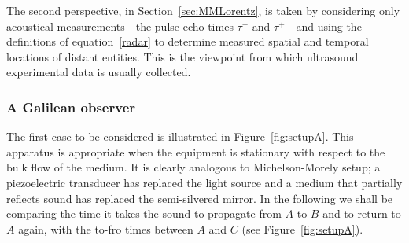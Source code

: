 \documentclass[10pt, fleqn,draft,showtrims,oldfontcommands]{article} %
\newcommand{\Secref}[1]{Section~\ref{sec:#1}}
\newcommand{\figref}[1]{Figure~\ref{fig:#1}}
\newcommand{\tm}{\tau^-}
\newcommand{\tp}{\tau^+}
\begin{document}
The second perspective, in \Secref{MMLorentz}, is taken by considering only  acoustical measurements - the pulse echo times $\tm$ and $\tp$ -
and using the definitions of equation~\ref{radar} to determine measured spatial and temporal locations of distant entities.
This is the viewpoint from which ultrasound experimental data is usually collected.









\subsubsection{A Galilean observer}\label{sec:MMGalilean}

The first case to be considered is illustrated in \figref{setupA}.
This apparatus is appropriate when the equipment is stationary with respect to the bulk flow of the medium.
It is clearly analogous to  Michelson-Morely setup;
a piezoelectric transducer has replaced the light source and a medium that partially reflects sound has replaced the semi-silvered mirror.
In the following we shall be comparing the time it takes the sound to propagate from $A$ to $B$ and to return to $A$ again,
with the to-fro times between $A$ and $C$ (see \figref{setupA}).
\end{document}
